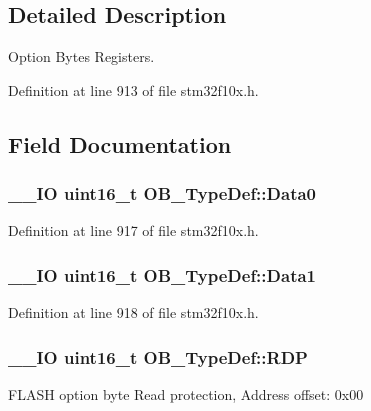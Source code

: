 \subsection{Detailed Description}
Option Bytes Registers. 

Definition at line 913 of file stm32f10x.\-h.



\subsection{Field Documentation}
\hypertarget{struct_o_b___type_def_a7570c0ba4b4d31c6061d595279e6b36e}{
\subsubsection[{Data0}]{\setlength{\rightskip}{0pt plus 5cm}\-\_\-\-\_\-\-I\-O {\bf uint16\-\_\-t} O\-B\-\_\-\-Type\-Def\-::\-Data0}}\label{struct_o_b___type_def_a7570c0ba4b4d31c6061d595279e6b36e}


Definition at line 917 of file stm32f10x.\-h.

\hypertarget{struct_o_b___type_def_a4e0e4a89db7004fb08a8a19129e9970e}{
\subsubsection[{Data1}]{\setlength{\rightskip}{0pt plus 5cm}\-\_\-\-\_\-\-I\-O {\bf uint16\-\_\-t} O\-B\-\_\-\-Type\-Def\-::\-Data1}}\label{struct_o_b___type_def_a4e0e4a89db7004fb08a8a19129e9970e}


Definition at line 918 of file stm32f10x.\-h.

\hypertarget{struct_o_b___type_def_ad9f9ae594003c39cc27f147e29a130bb}{
\subsubsection[{R\-D\-P}]{\setlength{\rightskip}{0pt plus 5cm}\-\_\-\-\_\-\-I\-O {\bf uint16\-\_\-t} O\-B\-\_\-\-Type\-Def\-::\-R\-D\-P}}\label{struct_o_b___type_def_ad9f9ae594003c39cc27f147e29a130bb}
F\-L\-A\-S\-H option byte Read protection, Address offset\-: 0x00 

